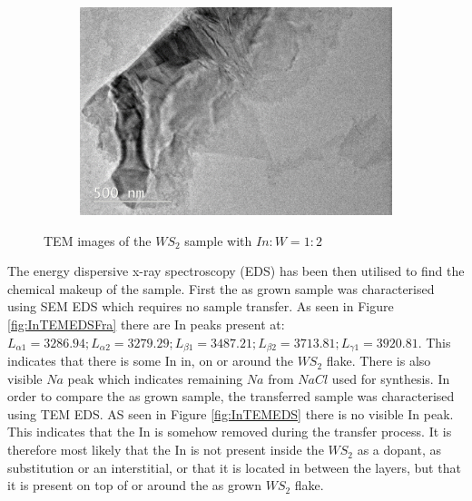\begin{figure}[!ht]
\begin{center}
		\begin{subfigure}[b]{0.65\textwidth}
			\includegraphics[width=\textwidth]{In/TEMImage3.png}
			\caption{}
			\label{fig:InTEMImage3}
		\end{subfigure}
		\caption{TEM images of the $WS_2$ sample with $In:W = 1:2$}
		\label{fig:InTEMImages}
	\end{center}
\end{figure}

The energy dispersive x-ray spectroscopy (EDS) has been then utilised to find the chemical makeup of the sample. First the as grown sample was characterised using SEM EDS which requires no sample transfer. As seen in Figure \ref{fig:InTEMEDSFra} there are In peaks present at: $L_{{\alpha}1} = 3286.94; L_{{\alpha}2} = 3279.29; L_{{\beta}1} = 3487.21; L_{{\beta}2} = 3713.81; L_{{\gamma}1} = 3920.81$. This indicates that there is some In in, on or around the $WS_2$ flake. There is also visible $Na$ peak which indicates remaining $Na$ from $NaCl$ used for synthesis. In order to compare the as grown sample, the transferred sample was characterised using TEM EDS. AS seen in Figure \ref{fig:InTEMEDS} there is no visible In peak. This indicates that the In is somehow removed during the transfer process. It is therefore most likely that the In is not present inside the $WS_2$ as a dopant, as substitution or an interstitial, or that it is located in between the layers, but that it is present on top of or around the as grown $WS_2$ flake.


